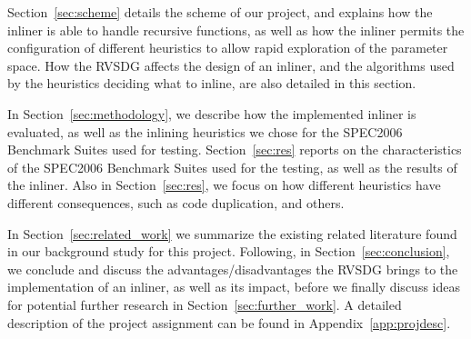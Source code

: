 Section~\ref{sec:scheme} details the scheme of our project, and explains how the
inliner is able to handle recursive functions, as well as how the inliner
permits the configuration of different heuristics to allow rapid exploration of
the parameter space. How the RVSDG affects the design of an inliner, and the
algorithms used by the heuristics deciding what to inline, are also detailed in
this section.

In Section~\ref{sec:methodology}, we describe how the implemented inliner is
evaluated, as well as the inlining heuristics we chose for the SPEC2006
Benchmark Suites used for testing. Section~\ref{sec:res} reports on the
characteristics of the SPEC2006 Benchmark Suites used for the testing, as well
as the results of the inliner. Also in Section~\ref{sec:res}, we focus on how
different heuristics have different consequences, such as code duplication, and
others.


In Section~\ref{sec:related_work} we summarize the existing related literature
found in our background study for this project. Following, in
Section~\ref{sec:conclusion}, we conclude and discuss the
advantages/disadvantages the RVSDG brings to the implementation of an inliner,
as well as its impact, before we finally discuss ideas for potential further
research in Section~\ref{sec:further_work}. A detailed description of the
project assignment can be found in Appendix~\ref{app:projdesc}.
